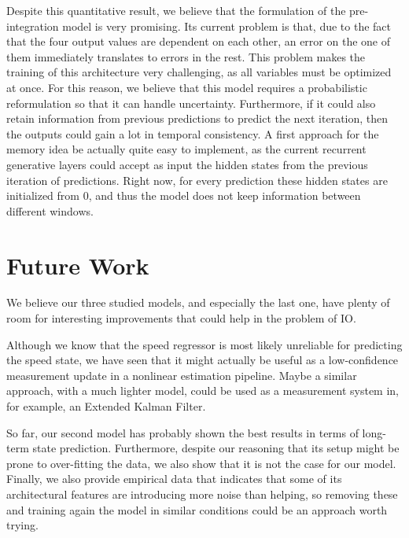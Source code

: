 Despite this quantitative result, we believe that the formulation of the pre-integration model is very promising.
Its current problem is that, due to the fact that the four output values are dependent on each other, an error on the one of them immediately translates to errors in the rest.
This problem makes the training of this architecture very challenging, as all variables must be optimized at once.
For this reason, we believe that this model requires a probabilistic reformulation so that it can handle uncertainty.
Furthermore, if it could also retain information from previous predictions to predict the next iteration, then the outputs could gain a lot in temporal consistency.
A first approach for the memory idea be actually quite easy to implement, as the current recurrent generative layers could accept as input the hidden states from the previous iteration of predictions.
Right now, for every prediction these hidden states are initialized from 0, and thus the model does not keep information between different windows.


\section{Future Work}\label{sec:future_work}

We believe our three studied models, and especially the last one, have plenty of room for interesting improvements that could help in the problem of IO.

Although we know that the speed regressor is most likely unreliable for predicting the speed state, we have seen that it might actually be useful as a low-confidence measurement update in a nonlinear estimation pipeline.
Maybe a similar approach, with a much lighter model, could be used as a measurement system in, for example, an Extended Kalman Filter.

So far, our second model has probably shown the best results in terms of long-term state prediction. 
Furthermore, despite our reasoning that its setup might be prone to over-fitting the data, we also show that it is not the case for our model.
Finally, we also provide empirical data that indicates that some of its architectural features are introducing more noise than helping, so removing these and training again the model in similar conditions could be an approach worth trying.

